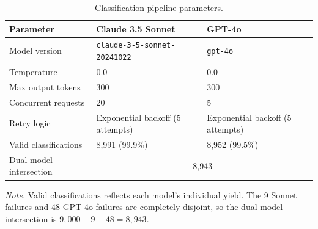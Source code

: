 \begin{table}[ht]
\centering
\caption{Classification pipeline parameters.}
\label{tab:classify_params}
\begin{tabular}{lll}
\toprule
Parameter & Claude 3.5 Sonnet & GPT-4o \\
\midrule
Model version & \texttt{claude-3-5-sonnet-20241022} & \texttt{gpt-4o} \\
Temperature & 0.0 & 0.0 \\
Max output tokens & 300 & 300 \\
Concurrent requests & 20 & 5 \\
Retry logic & Exponential backoff (5 attempts) & Exponential backoff (5 attempts) \\
Valid classifications & 8,991 (99.9\%) & 8,952 (99.5\%) \\
Dual-model intersection & \multicolumn{2}{c}{8,943} \\
\bottomrule
\end{tabular}
\begin{flushleft}
\footnotesize
\textit{Note.} Valid classifications reflects each model's individual yield. The 9 Sonnet failures and 48 GPT-4o failures are completely disjoint, so the dual-model intersection is $9{,}000 - 9 - 48 = 8{,}943$.
\end{flushleft}
\end{table}
